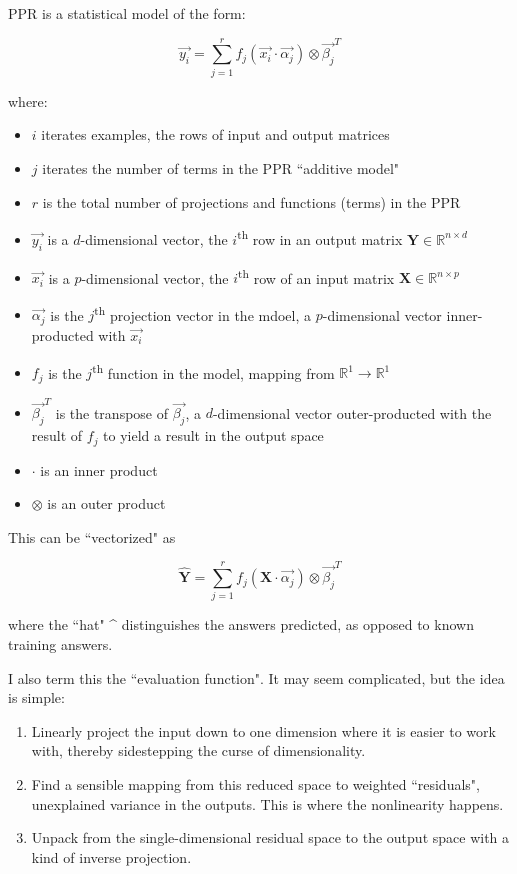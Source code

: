 \documentclass[12pt]{article}
\begin{document}
PPR is a statistical model of the form:

$$\vec{y_i} = \sum_{j=1}^{r} f_j(\vec{x_i} \cdot \vec{\alpha_j}) \otimes \vec{\beta_j}^T$$

where:
\begin{itemize}
	\setlength\itemsep{-2mm}
	\item $i$ iterates examples, the rows of input and output matrices
	\item $j$ iterates the number of terms in the PPR ``additive model"
	\item $r$ is the total number of projections and functions (terms) in the PPR
	\item $\vec{y_i}$ is a $d$-dimensional vector, the $i$\textsuperscript{th} row in an output matrix $\pmb{Y} \in \mathbb{R}^{n \times d}$
	\item $\vec{x_i}$ is a $p$-dimensional vector, the $i$\textsuperscript{th} row of an input matrix $\pmb{X} \in \mathbb{R}^{n \times p}$
	\item $\vec{\alpha_j}$ is the $j$\textsuperscript{th} projection vector in the mdoel, a $p$-dimensional vector inner-producted with $\vec{x_i}$
	\item $f_j$ is the $j$\textsuperscript{th} function in the model, mapping from $\mathbb{R}^1 \rightarrow \mathbb{R}^1$
	\item $\vec{\beta_j}^T$ is the transpose of $\vec{\beta_j}$, a $d$-dimensional vector outer-producted with the result of $f_j$ to yield a result in the output space
	\item $\cdot$ is an inner product
	\item $\otimes$ is an outer product
\end{itemize}

This can be ``vectorized" as

$$\pmb{\hat{Y}} = \sum_{j=1}^r f_j(\pmb{X} \cdot \vec{\alpha_j}) \otimes \vec{\beta_j}^T$$

where the ``hat" \string^ distinguishes the answers predicted, as opposed to known training answers.\newline

I also term this the ``evaluation function". It may seem complicated, but the idea is simple:

\begin{enumerate}
	\setlength\itemsep{-2mm}
	\item Linearly project the input down to one dimension where it is easier to work with, thereby sidestepping the curse of dimensionality.
	\item Find a sensible mapping from this reduced space to weighted ``residuals", unexplained variance in the outputs. This is where the nonlinearity happens.
	\item Unpack from the single-dimensional residual space to the output space with a kind of inverse projection.
\end{enumerate}
\end{document}
